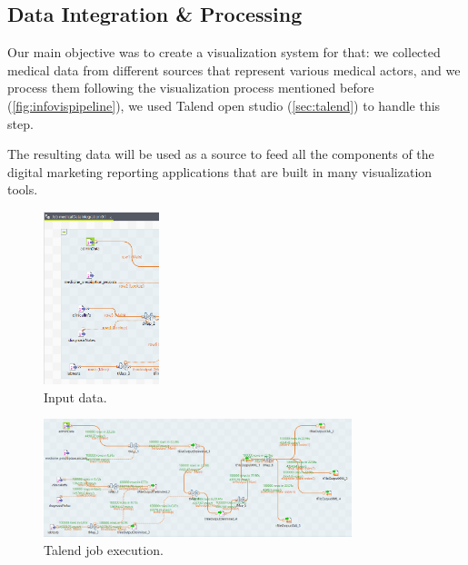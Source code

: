 \subsection{Data Integration \& Processing}

Our main objective was to create a visualization system for that: we collected medical data from different sources that represent various medical actors, and we process them following the visualization process mentioned before (\ref{fig:infovispipeline}), we used Talend open studio (\ref{sec:talend}) to handle this step.

The resulting data will be used as a source to feed all the components of the digital marketing reporting applications that are built in many visualization tools.
\begin{figure}[h!]
  \center
  \includegraphics[width=0.30\textwidth]{images/chapter3/jobInputs.PNG}
  \caption{Input data.}
  \label{fig:jobinputes}
\end{figure}
\begin{figure}[h!]
  \center
  \includegraphics[width=0.80\textwidth]{images/chapter3/jobresult.PNG}
  \caption{Talend job execution.}
  \label{fig:jobtalend}
\end{figure}